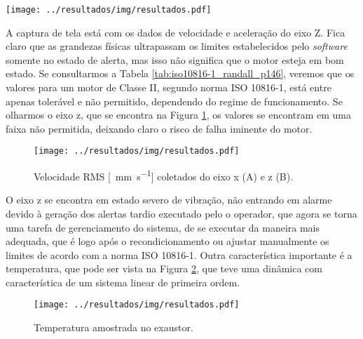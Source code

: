 \documentclass[a4paper]{ifacconf}
\begin{document}
\begin{figure*}[h!]
  \begin{center}
      \texttt{[image: ../resultados/img/resultados.pdf]}
  \end{center}
  \caption{Captura do lado direito da tela do sistema instalado no exaustor.}
  \label{fig:exaustor_1}
\end{figure*}


A captura de tela está com os dados de velocidade e aceleração do eixo Z. Fica claro que as grandezas físicas
ultrapassam os limites estabelecidos pelo \textit{software} somente no estado de alerta, mas isso não significa que o motor esteja em bom estado.
Se consultarmos a Tabela \ref{tab:iso10816-1_randall_p146}, veremos que os valores para um motor de Classe II, segundo norma  ISO 10816-1, está 
entre apenas tolerável e não permitido, dependendo do regime de funcionamento. 
Se olharmos o eixo z, que se encontra na Figura \ref{fig:exaustor_xz}, os valores se encontram em uma faixa não permitida, deixando claro o risco 
de falha iminente do motor.

\begin{figure}[H]
  \begin{center}
      \texttt{[image: ../resultados/img/resultados.pdf]}
  \end{center}
  \caption{Velocidade RMS [\SI{}{\milli\metre\per\second}] coletados do eixo x (A) e z (B).}
  \label{fig:exaustor_xz}
\end{figure}

O eixo z se encontra em estado severo de vibração, não entrando em alarme devido à geração dos alertas tardio executado
pelo o operador, que agora se torna uma tarefa de gerenciamento do sistema, de se executar da maneira mais adequada, que é logo após o recondicionamento 
ou ajustar manualmente os limites de acordo com a norma ISO 10816-1. Outra característica importante é a temperatura, que pode ser vista na 
Figura \ref{fig:exaustor_temperatura}, que teve uma dinâmica com característica de um sistema linear de primeira ordem.


\begin{figure}[H]
  \begin{center}
      \texttt{[image: ../resultados/img/resultados.pdf]}
  \end{center}
  \caption{Temperatura amostrada no exaustor.}
  \label{fig:exaustor_temperatura}
\end{figure}
\end{document}

